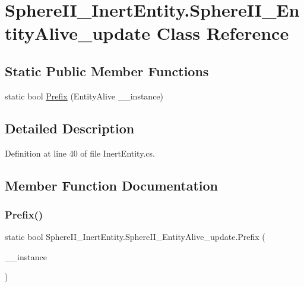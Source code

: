 \hypertarget{class_sphere_i_i___inert_entity_1_1_sphere_i_i___entity_alive__update}{}\section{Sphere\+I\+I\+\_\+\+Inert\+Entity.\+Sphere\+I\+I\+\_\+\+Entity\+Alive\+\_\+update Class Reference}
\label{class_sphere_i_i___inert_entity_1_1_sphere_i_i___entity_alive__update}
\subsection*{Static Public Member Functions}
\begin{DoxyCompactItemize}
\item 
static bool \mbox{\hyperlink{class_sphere_i_i___inert_entity_1_1_sphere_i_i___entity_alive__update_a0b14a908a684a888c435c9787ec1c058}{Prefix}} (Entity\+Alive \+\_\+\+\_\+instance)
\end{DoxyCompactItemize}


\subsection{Detailed Description}


Definition at line 40 of file Inert\+Entity.\+cs.



\subsection{Member Function Documentation}
\mbox{\label{class_sphere_i_i___inert_entity_1_1_sphere_i_i___entity_alive__update_a0b14a908a684a888c435c9787ec1c058}} 
\subsubsection{\texorpdfstring{Prefix()}{Prefix()}}
{\footnotesize\ttfamily static bool Sphere\+I\+I\+\_\+\+Inert\+Entity.\+Sphere\+I\+I\+\_\+\+Entity\+Alive\+\_\+update.\+Prefix (\begin{DoxyParamCaption}\item[{Entity\+Alive}]{\+\_\+\+\_\+instance }\end{DoxyParamCaption})\hspace{0.3cm}{\ttfamily [static]}}



